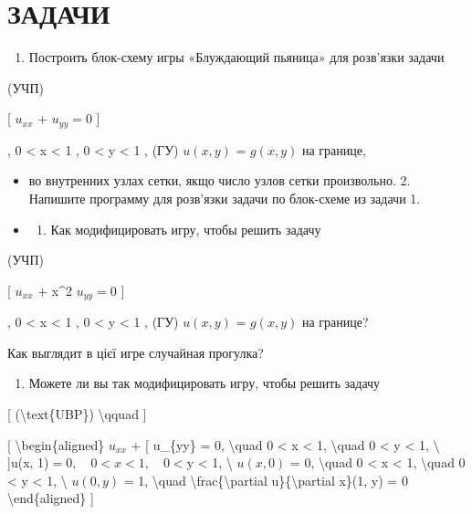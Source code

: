 \documentclass[
]{article}
\providecommand{\tightlist}{%
  \setlength{\itemsep}{0pt}\setlength{\parskip}{0pt}}
\begin{document}
{{{\section{ЗАДАЧИ}\label{ux437ux430ux434ux430ux447ux438-19}

\begin{enumerate}
\def\labelenumi{\arabic{enumi}.}
\tightlist
\item
  Построить блок-схему игры «Блуждающий пьяница» для розв'язки задачи
\end{enumerate}

(УЧП)

{[} \(u_{xx}\) + \(u_{yy} = 0\) {]}

, 0 \textless{} x \textless{} 1 , 0 \textless{} y \textless{} 1 , (ГУ)
\(u(x, y)\) = \(g(x, y)\) на границе,

\begin{itemize}
\item
  во внутренних узлах сетки, якщо число узлов сетки произвольно. 2.
  Напишите программу для розв'язки задачи по блок-схеме из задачи 1.
\item
  \begin{enumerate}
  \def\labelenumi{\arabic{enumi}.}
  \setcounter{enumi}{2}
  \tightlist
  \item
    Как модифицировать игру, чтобы решить задачу
  \end{enumerate}
\end{itemize}

(УЧП)

{[} \(u_{xx}\) + x\^{}2 \(u_{yy} = 0\) {]}

, 0 \textless{} x \textless{} 1 , 0 \textless{} y \textless{} 1 , (ГУ)
\(u(x, y)\) = \(g(x, y)\) на границе?

Как выглядит в цієї игре случайная прогулка?

\begin{enumerate}
\def\labelenumi{\arabic{enumi}.}
\setcounter{enumi}{3}
\tightlist
\item
  Можете ли вы так модифицировать игру, чтобы решить задачу
\end{enumerate}

{[} (\textbackslash text\{UBP\}) \textbackslash qquad {]}

{[} \textbackslash begin\{aligned\} \(u_{xx}\) + {[} u\_\{yy\} = 0,
\textbackslash quad 0 \textless{} x \textless{} 1, \textbackslash quad 0
\textless{} y \textless{} 1, \textbackslash{} {]}u(x,
1)\(= 0, \quad 0 < x < 1, \quad 0 <\)y \textless{} 1, \textbackslash{}
\(u(x, 0)\) = 0, \textbackslash quad 0 \textless{} x \textless{} 1,
\textbackslash quad 0 \textless{} y \textless{} 1, \textbackslash{}
\(u(0, y)\) = 1, \textbackslash quad
\textbackslash frac\{\textbackslash partial u\}\{\textbackslash partial
x\}(1, y) = 0 \textbackslash end\{aligned\} {]}

}}}
\end{document}
